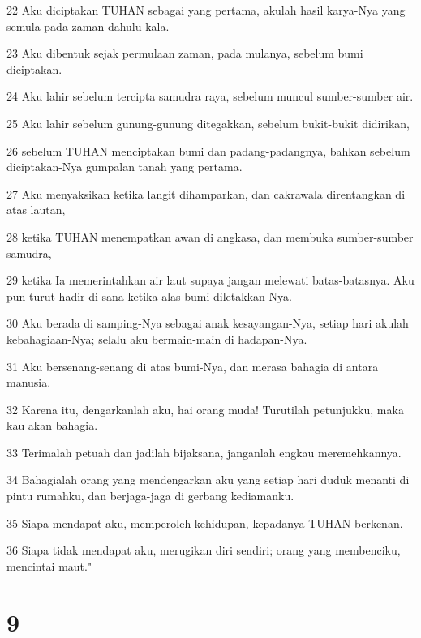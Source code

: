 \par 22 Aku diciptakan TUHAN sebagai yang pertama, akulah hasil karya-Nya yang semula pada zaman dahulu kala.
\par 23 Aku dibentuk sejak permulaan zaman, pada mulanya, sebelum bumi diciptakan.
\par 24 Aku lahir sebelum tercipta samudra raya, sebelum muncul sumber-sumber air.
\par 25 Aku lahir sebelum gunung-gunung ditegakkan, sebelum bukit-bukit didirikan,
\par 26 sebelum TUHAN menciptakan bumi dan padang-padangnya, bahkan sebelum diciptakan-Nya gumpalan tanah yang pertama.
\par 27 Aku menyaksikan ketika langit dihamparkan, dan cakrawala direntangkan di atas lautan,
\par 28 ketika TUHAN menempatkan awan di angkasa, dan membuka sumber-sumber samudra,
\par 29 ketika Ia memerintahkan air laut supaya jangan melewati batas-batasnya. Aku pun turut hadir di sana ketika alas bumi diletakkan-Nya.
\par 30 Aku berada di samping-Nya sebagai anak kesayangan-Nya, setiap hari akulah kebahagiaan-Nya; selalu aku bermain-main di hadapan-Nya.
\par 31 Aku bersenang-senang di atas bumi-Nya, dan merasa bahagia di antara manusia.
\par 32 Karena itu, dengarkanlah aku, hai orang muda! Turutilah petunjukku, maka kau akan bahagia.
\par 33 Terimalah petuah dan jadilah bijaksana, janganlah engkau meremehkannya.
\par 34 Bahagialah orang yang mendengarkan aku yang setiap hari duduk menanti di pintu rumahku, dan berjaga-jaga di gerbang kediamanku.
\par 35 Siapa mendapat aku, memperoleh kehidupan, kepadanya TUHAN berkenan.
\par 36 Siapa tidak mendapat aku, merugikan diri sendiri; orang yang membenciku, mencintai maut."

\chapter{9}

